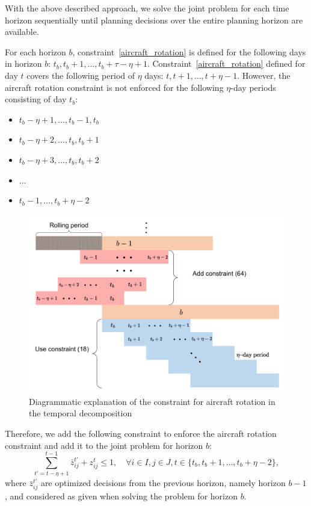 With the above described approach, we solve the joint problem for each time horizon sequentially until planning decisions over the entire planning horizon are available.



For each horizon $b$, constraint~\eqref{aircraft_rotation} is defined for the following days in horizon $b$: $t_b, t_b+1,\dots,t_b+\tau-\eta+1$. Constraint~\eqref{aircraft_rotation} defined for day $t$ covers the following period of $\eta$ days: $t, t+1,\dots,t+\eta-1$. However, the aircraft rotation constraint is not enforced for the following $\eta$-day periods consisting of day $t_b$:
\begin{itemize}
    \item $t_b-\eta+1,\dots,t_b-1,t_b$
    \item $t_b-\eta+2,\dots,t_b,t_b+1$
    \item $t_b-\eta+3,\dots,t_b,t_b+2$
    \item $\dots$
    \item $t_b-1,\dots,t_b +\eta-2$
\end{itemize}

\begin{figure}[htbp]
    \centering
    \includegraphics[width=0.7\linewidth]{rh_station_rotation_constraint.pdf} 
    \caption{Diagrammatic explanation of the constraint for aircraft rotation in the temporal decomposition}
    \label{fig:td_stat_rotate}
\end{figure}

Therefore, we add the following constraint to enforce the aircraft rotation constraint and add it to the joint problem for horizon $b$:
\begin{equation}
    \sum_{t'=t - \eta+1}^{t-1} \bar{z}_{ij}^{t'} + z_{ij}^t \leq 1, \quad \forall i \in I, j \in J, t \in \{t_b, t_b +1, \dots, t_b +\eta-2\}, \label{eq:transitionOverTb}
\end{equation}
where $\bar{z}_{ij}^{t'}$ are optimized decisions from the previous horizon, namely horizon $b-1$, and considered as given when solving the problem for horizon $b$.


